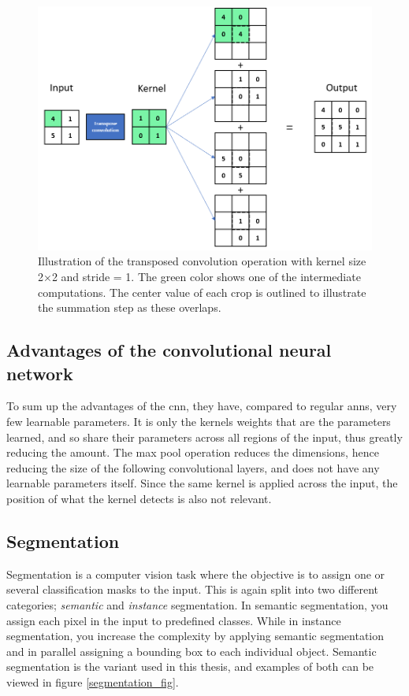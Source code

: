     \begin{figure}[H]
        \centering
        \includegraphics[scale=0.5]{figures/transpose_convolution.png}
        \caption[Transposed convolution]{Illustration of the transposed convolution operation with kernel size 2×2 and stride = 1. The green color shows one of the intermediate computations. The center value of each crop is outlined to illustrate the summation step as these overlaps.}
      	\medskip 
        \label{transposed_conv_fig}
    \end{figure}
    
\subsection{Advantages of the convolutional neural network}
    To sum up the advantages of the \gls{cnn}\cite{o2015introduction_convolutions}, they have, compared to regular \gls{ann}s, very few learnable parameters. It is only the kernels weights that are the parameters learned, and so share their parameters across all regions of the input, thus greatly reducing the amount. The max pool operation reduces the dimensions, hence reducing the size of the following convolutional layers, and does not have any learnable parameters itself. Since the same kernel is applied across the input, the position of what the kernel detects is also not relevant.
    
    
\subsection{Segmentation}
    Segmentation is a computer vision task where the objective is to assign one or several classification masks to the input\cite{He_2017_ICCV_segmentation}. This is again split into two different categories; \textit{semantic} and \textit{instance} segmentation. In semantic segmentation, you assign each pixel in the input to predefined classes. While in instance segmentation, you increase the complexity by applying semantic segmentation and in parallel assigning a bounding box to each individual object. Semantic segmentation is the variant used in this thesis, and examples of both can be viewed in figure \ref{segmentation_fig}.
    
